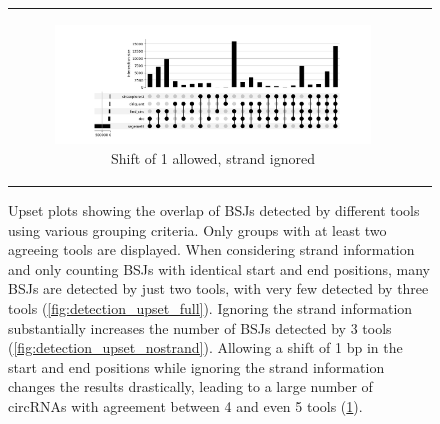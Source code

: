 \begin{figure}[ht]
\begin{tabular}{cc}
{\begin{subfigure}{\textwidth}
                \includegraphics[width=\linewidth]{chapters/4_results_and_discussion/figures/detection/upset/diff_1_nostrand.png}
                \caption{Shift of 1 allowed, strand ignored}
                \label{fig:detection_upset_microshift}

            \end{subfigure}}
    \end{tabular}
    \caption{Upset plots showing the overlap of BSJs detected by different
        tools using various grouping criteria.
        Only groups with at least two agreeing tools are displayed.
        When considering strand information and only counting BSJs with identical start
        and end positions, many BSJs are detected by just two tools, with very few
        detected by three tools (\cref{fig:detection_upset_full}).
        Ignoring the strand information substantially increases the number of BSJs
        detected by 3 tools (\cref{fig:detection_upset_nostrand}).
        Allowing a shift of 1 bp in the start and end positions while ignoring the
        strand information changes the results drastically, leading to a large number
        of circRNAs with agreement between 4 and even 5 tools
        (\cref{fig:detection_upset_microshift}).
    }
    \label{fig:detection_upset}
\end{figure}

